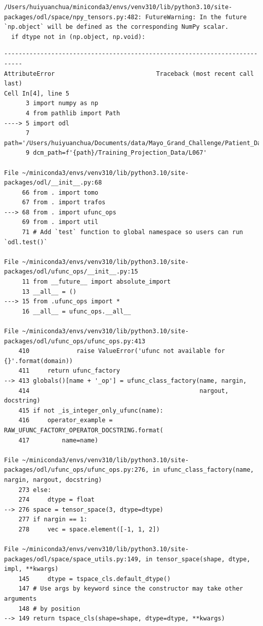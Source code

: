 \documentclass[a4paper, 11pt]{article}
\begin{document}
\begin{verbatim}
/Users/huiyuanchua/miniconda3/envs/venv310/lib/python3.10/site-packages/odl/space/npy_tensors.py:482: FutureWarning: In the future `np.object` will be defined as the corresponding NumPy scalar.
  if dtype not in (np.object, np.void):
\end{verbatim}

\begin{verbatim}
---------------------------------------------------------------------------
AttributeError                            Traceback (most recent call last)
Cell In[4], line 5
      3 import numpy as np
      4 from pathlib import Path
----> 5 import odl
      7 path='/Users/huiyuanchua/Documents/data/Mayo_Grand_Challenge/Patient_Data'
      9 dcm_path=f'{path}/Training_Projection_Data/L067'

File ~/miniconda3/envs/venv310/lib/python3.10/site-packages/odl/__init__.py:68
     66 from . import tomo
     67 from . import trafos
---> 68 from . import ufunc_ops
     69 from . import util
     71 # Add `test` function to global namespace so users can run `odl.test()`

File ~/miniconda3/envs/venv310/lib/python3.10/site-packages/odl/ufunc_ops/__init__.py:15
     11 from __future__ import absolute_import
     13 __all__ = ()
---> 15 from .ufunc_ops import *
     16 __all__ = ufunc_ops.__all__

File ~/miniconda3/envs/venv310/lib/python3.10/site-packages/odl/ufunc_ops/ufunc_ops.py:413
    410             raise ValueError('ufunc not available for {}'.format(domain))
    411     return ufunc_factory
--> 413 globals()[name + '_op'] = ufunc_class_factory(name, nargin,
    414                                               nargout, docstring)
    415 if not _is_integer_only_ufunc(name):
    416     operator_example = RAW_UFUNC_FACTORY_OPERATOR_DOCSTRING.format(
    417         name=name)

File ~/miniconda3/envs/venv310/lib/python3.10/site-packages/odl/ufunc_ops/ufunc_ops.py:276, in ufunc_class_factory(name, nargin, nargout, docstring)
    273 else:
    274     dtype = float
--> 276 space = tensor_space(3, dtype=dtype)
    277 if nargin == 1:
    278     vec = space.element([-1, 1, 2])

File ~/miniconda3/envs/venv310/lib/python3.10/site-packages/odl/space/space_utils.py:149, in tensor_space(shape, dtype, impl, **kwargs)
    145     dtype = tspace_cls.default_dtype()
    147 # Use args by keyword since the constructor may take other arguments
    148 # by position
--> 149 return tspace_cls(shape=shape, dtype=dtype, **kwargs)


\end{verbatim}
\end{document}
